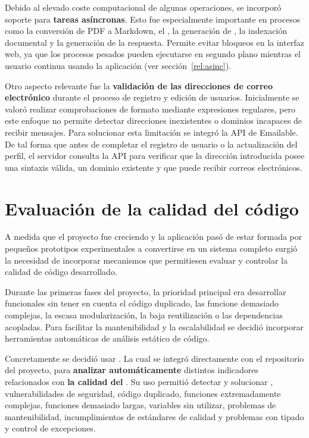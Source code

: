 Debido al elevado coste computacional de algunas operaciones, se incorporó soporte para \textbf{tareas asíncronas}. Esto fue especialmente importante en procesos como la conversión de PDF a Markdown, el , la generación de , la indexación documental y la generación de la respuesta. Permite evitar bloqueos en la interfaz web, ya que los procesos pesados pueden ejecutarse en segundo plano mientras el usuario continua usando la aplicación (ver sección~\ref{rel:asinc}). 

Otro aspecto relevante fue la \textbf{validación de las direcciones de correo electrónico} durante el proceso de registro y edición de usuarios. Inicialmente se valoró realizar comprobaciones de formato mediante expresiones regulares, pero este enfoque no permite detectar direcciones inexistentes o dominios incapaces de recibir mensajes. Para solucionar esta limitación se integró la API de Emailable. De tal forma que antes de completar el registro de usuario o la actualización del perfil, el servidor consulta la API para verificar que la dirección introducida posee una sintaxis válida, un dominio existente y que puede recibir correos electrónicos.

\section{Evaluación de la calidad del código}

A medida que el proyecto fue creciendo y la aplicación pasó de estar formada por pequeños prototipos experimentales a convertirse en un sistema  completo surgió la necesidad de incorporar mecanismos que permitiesen evaluar y controlar la calidad de código desarrollado.

Durante las primeras fases del proyecto, la prioridad principal era desarrollar  funcionales sin tener en cuenta el código duplicado, las funcione demasiado complejas, la escasa modularización, la baja reutilización o las dependencias acopladas. Para facilitar la mantenibilidad y la escalabilidad se decidió incorporar herramientas automáticas de análisis estático de código.

Concretamente se decidió usar . La cual se integró directamente con el repositorio  del proyecto, para \textbf{analizar automáticamente} distintos indicadores relacionados con \textbf{la calidad del }. Su uso permitió detectar y solucionar , vulnerabilidades de seguridad, código duplicado, funciones extremadamente complejas, funciones demasiado largas, variables sin utilizar, problemas de mantenibilidad, incumplimientos de estándares de calidad y problemas con tipado y control de excepciones.

